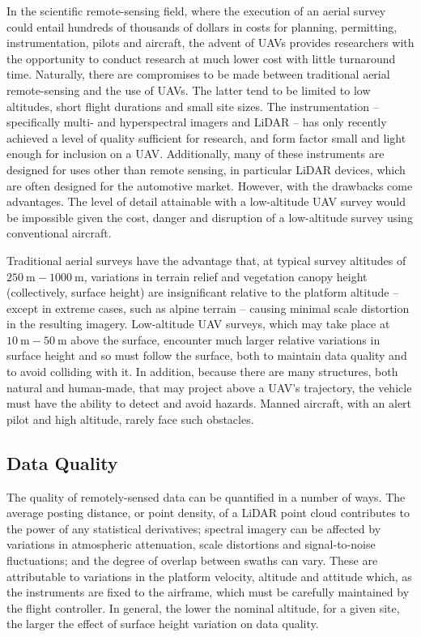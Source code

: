 \documentclass[doc]{apa6}
\begin{document}
In the scientific remote-sensing field, where the execution of an aerial survey could entail hundreds of thousands of dollars in costs for planning, permitting, instrumentation, pilots and aircraft, the advent of UAVs provides researchers with the opportunity to conduct research at much lower cost with little turnaround time. Naturally, there are compromises to be made between traditional aerial remote-sensing and the use of UAVs. The latter tend to be limited to low altitudes, short flight durations and small site sizes. The instrumentation -- specifically multi- and hyperspectral imagers and LiDAR -- has only recently achieved a level of quality sufficient for research, and form factor small and light enough for inclusion on a UAV. Additionally, many of these instruments are designed for uses other than remote sensing, in particular LiDAR devices, which are often designed for the automotive market. However, with the drawbacks come advantages. The level of detail attainable with a low-altitude UAV survey would be impossible given the cost, danger and disruption of a low-altitude survey using conventional aircraft.

Traditional aerial surveys have the advantage that, at typical survey altitudes of $\SI{250}\m-\SI{1000}\m$, variations in terrain relief and vegetation canopy height (collectively, surface height) are insignificant relative to the platform altitude -- except in extreme cases, such as alpine terrain -- causing minimal scale distortion in the resulting imagery. Low-altitude UAV surveys, which may take place at $\SI{10}\m-\SI{50}\m$ above the surface, encounter much larger relative variations in surface height and so must follow the surface, both to maintain data quality and to avoid colliding with it. In addition, because there are many structures, both natural and human-made, that may project above a UAV's trajectory, the vehicle must have the ability to detect and avoid hazards. Manned aircraft, with an alert pilot and high altitude, rarely face such obstacles. 

\subsection{Data Quality}

The quality of remotely-sensed data can be quantified in a number of ways. The average posting distance, or point density, of a LiDAR point cloud contributes to the power of any statistical derivatives; spectral imagery can be affected by variations in atmospheric attenuation, scale distortions and signal-to-noise fluctuations; and the degree of overlap between swaths can vary. These are attributable to variations in the platform velocity, altitude and attitude which, as the instruments are fixed to the airframe, which must be carefully maintained by the flight controller. In general, the lower the nominal altitude, for a given site, the larger the effect of surface height variation on data quality.
\end{document}
